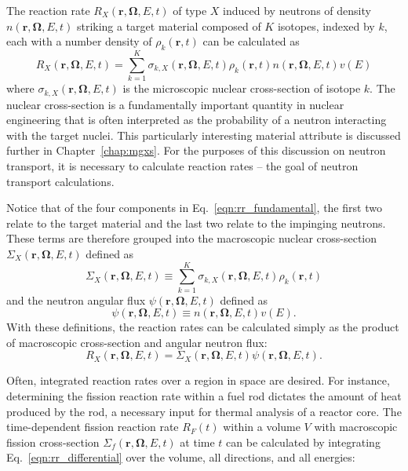The reaction rate $R_X(\mathbf{r}, \mathbf{\Omega}, E, t)$ of type $X$ induced by neutrons of density $n(\mathbf{r}, \mathbf{\Omega}, E, t)$ striking a target material composed of $K$ isotopes, indexed by $k$, each with a number density of $\rho_k(\mathbf{r}, t)$ can be calculated as
\begin{equation}
R_X(\mathbf{r}, \mathbf{\Omega}, E, t) = \sum_{k=1}^K \sigma_{k,X}(\mathbf{r}, \mathbf{\Omega}, E, t) \rho_k(\mathbf{r}, t) n(\mathbf{r}, \mathbf{\Omega}, E, t) v(E) 
\label{eqn:rr_fundamental}
\end{equation}
where $\sigma_{k,X}(\mathbf{r}, \mathbf{\Omega}, E, t)$ is the microscopic nuclear cross-section of isotope $k$\cite{duderstadt}. The nuclear cross-section is a fundamentally important quantity in nuclear engineering that is often interpreted as the probability of a neutron interacting with the target nuclei. This particularly interesting material attribute is discussed further in Chapter~\ref{chap:mgxs}. For the purposes of this discussion on neutron transport, it is necessary to calculate reaction rates -- the goal of neutron transport calculations.

Notice that of the four components in Eq.~\ref{eqn:rr_fundamental}, the first two relate to the target material and the last two relate to the impinging neutrons. These terms are therefore grouped into the macroscopic nuclear cross-section $\Sigma_X(\mathbf{r}, \mathbf{\Omega}, E, t)$ defined as
\begin{equation}
\Sigma_X(\mathbf{r}, \mathbf{\Omega}, E, t) \equiv \sum_{k=1}^K \sigma_{k,X}(\mathbf{r}, \mathbf{\Omega}, E, t) \rho_k(\mathbf{r}, t)
\end{equation} 
and the neutron angular flux $\psi(\mathbf{r}, \mathbf{\Omega}, E, t)$ defined as
\begin{equation}
\psi(\mathbf{r}, \mathbf{\Omega}, E, t) \equiv n(\mathbf{r}, \mathbf{\Omega}, E, t) v(E).
\label{eqn:angular_neutron_flux}
\end{equation}
With these definitions, the reaction rates can be calculated simply as the product of macroscopic cross-section and angular neutron flux:
\begin{equation}
R_X(\mathbf{r}, \mathbf{\Omega}, E, t) = \Sigma_X(\mathbf{r}, \mathbf{\Omega}, E, t) \psi(\mathbf{r}, \mathbf{\Omega}, E, t).
\label{eqn:rr_differential}
\end{equation}

Often, integrated reaction rates over a region in space are desired. For instance, determining the fission reaction rate within a fuel rod dictates the amount of heat produced by the rod, a necessary input for thermal analysis of a reactor core. The time-dependent fission reaction rate $R_F(t)$ within a volume $V$ with macroscopic fission cross-section $\Sigma_f(\mathbf{r}, \mathbf{\Omega}, E, t)$ at time $t$ can be calculated by integrating Eq.~\ref{eqn:rr_differential} over the volume, all directions, and all energies:

